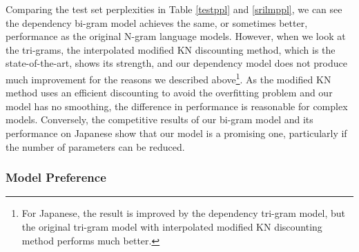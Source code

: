 \documentclass[english]{jnlp_1.4}
\begin{document}
Comparing the test set perplexities in Table \ref{testppl} and \ref{srilmppl}, we can see the dependency bi-gram model achieves the same, or sometimes better, performance as the original N-gram language models. However, when we look at the tri-grams, the interpolated modified KN discounting method, which is the state-of-the-art, shows its strength, and our dependency model does not produce much improvement for the reasons we described above\footnote{For Japanese, the result is improved by the dependency tri-gram model, but the original tri-gram model with interpolated modified KN discounting method performs much better.}. As the modified KN method uses an efficient discounting to avoid the overfitting problem and our model has no smoothing, the difference in performance is reasonable for complex models. Conversely, the competitive results of our bi-gram model and its performance on Japanese show that our model is a promising one, particularly if the number of parameters can be reduced.


\subsubsection{Model Preference}
\end{document}
